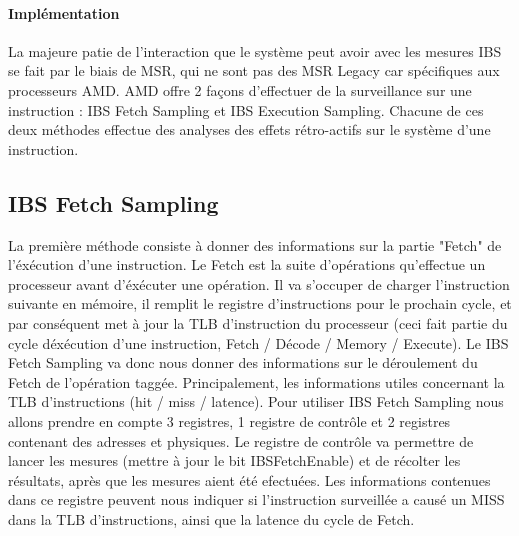 		\paragraph{Implémentation}
			La majeure patie de l'interaction que le système peut avoir avec les mesures IBS se fait par le biais de MSR, qui ne sont pas des MSR Legacy car spécifiques aux processeurs AMD. AMD offre 2 façons d'effectuer de la surveillance sur une instruction : IBS Fetch Sampling et IBS Execution Sampling. Chacune de ces deux méthodes effectue des analyses des effets rétro-actifs sur le système d'une instruction. \\
			\subsection{IBS Fetch Sampling}
			La première méthode consiste à donner des informations sur la partie "Fetch" de l'éxécution d'une instruction. Le Fetch est la suite d'opérations qu'effectue un processeur avant d'éxécuter une opération. Il va s'occuper de charger l'instruction suivante en mémoire, il remplit le registre d'instructions pour le prochain cycle, et par conséquent met à jour la TLB d'instruction du processeur (ceci fait partie du cycle déxécution d'une instruction, Fetch / Décode / Memory / Execute). Le IBS Fetch Sampling va donc nous donner des informations sur le déroulement du Fetch de l'opération taggée. Principalement, les informations utiles concernant la TLB d'instructions (hit / miss / latence). Pour utiliser IBS Fetch Sampling nous allons prendre en compte 3 registres, 1 registre de contrôle et 2 registres contenant des adresses et physiques. Le registre de contrôle va permettre de lancer les mesures (mettre à jour le bit IBSFetchEnable) et de récolter les résultats, après que les mesures aient été efectuées. Les informations contenues dans ce registre peuvent nous indiquer si l'instruction surveillée a causé un MISS dans la TLB d'instructions, ainsi que la latence du cycle de Fetch.\\
